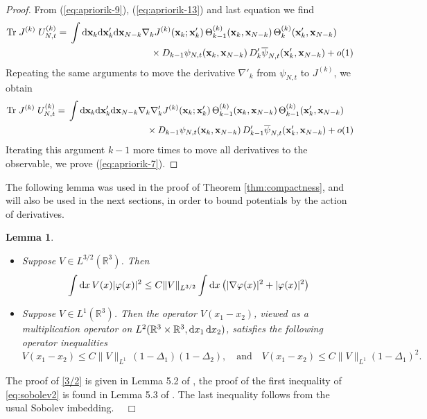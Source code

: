 \documentclass[11pt]{article}
\newtheorem{lemma}[theorem]{Lemma}
\newcommand{\rd}{{\rm d}}
\newcommand{\bx}{{\bf x}}
\newcommand{\ph}{\varphi}
\newcommand{\bR}{{\mathbb R}}
\newcommand{\tr}{\mbox{Tr}}
\begin{document}
\begin{proof}
\medskip

{F}rom (\ref{eq:apriorik-9}), (\ref{eq:apriorik-13}) and last
equation we find
\begin{equation}
\begin{split}
\tr \; J^{(k)} \; U_{N,t}^{(k)}
 = \; & \int \rd \bx_k \rd \bx'_k \rd \bx_{N-k} \nabla_k J^{(k)} (\bx_k; \bx'_k) \,
\Theta_{k-1}^{(k)} (\bx_k,\bx_{N-k}) \, \Theta_k^{(k)}
(\bx'_k,\bx_{N-k}) \\ &\hspace{3cm} \times  D_{k-1}  \psi_{N,t}
(\bx_k, \bx_{N-k}) \, D'_k \overline{\psi}_{N,t} (\bx'_k,\bx_{N-k})
+ o(1)
\end{split}
\end{equation}
Repeating the same arguments to move the derivative $\nabla'_k$ from
$ \psi_{N,t}$ to $J^{(k)}$, we obtain
\begin{equation}
\begin{split}
\tr \; J^{(k)} \; U_{N,t}^{(k)} = \; & \int \rd \bx_k \rd \bx'_k \rd
\bx_{N-k} \nabla_k \nabla'_k J^{(k)} (\bx_k; \bx'_k) \,
\Theta_{k-1}^{(k)} (\bx_k,\bx_{N-k}) \, \Theta_{k-1}^{(k)}
(\bx'_k,\bx_{N-k}) \\ &\hspace{3cm} \times D_{k-1}  \psi_{N,t}
(\bx_k, \bx_{N-k}) \, D'_{k-1} \overline{\psi}_{N,t}
(\bx'_k,\bx_{N-k}) + o(1)
\end{split}
\end{equation}
Iterating this argument $k-1$ more times to move all derivatives to
the observable, we prove (\ref{eq:apriorik-7}).
\end{proof}


The following lemma was used in the proof of Theorem
\ref{thm:compactness}, and will also be used in the next sections,
in order to bound potentials by the action of derivatives.

\begin{lemma}\label{lm:sobolev}
\begin{itemize}
\item[i)] Suppose $V \in L^{3/2} (\bR^3)$. Then
\begin{equation}\label{3/2}
\int \rd x \, V (x) |\ph (x)|^2 \leq C \| V \|_{L^{3/2}} \int \rd x
\left( |\nabla \ph (x)|^2 + |\ph (x)|^2 \right)
\end{equation}
\item[ii)] Suppose $V  \in L^1 (\bR^3)$. Then the operator $V (x_1 -x_2)$,
viewed as a multiplication operator on $L^2 (\bR^3\times \bR^3, \rd
x_1 \, \rd x_2)$, satisfies the  following operator inequalities
\begin{equation}\label{eq:sobolev2}
V (x_1 -x_2) \leq C \| V \|_{L^1} \, (1-\Delta_1) (1-\Delta_2),
\quad \text{and}  \quad V (x_1 -x_2) \leq C \| V \|_{L^1}
(1-\Delta_1)^2.
\end{equation}
\end{itemize}
\end{lemma}
The proof of \eqref{3/2} is given in Lemma 5.2 of \cite{ESY},
the proof of the first inequality of \eqref{eq:sobolev2}
is found in Lemma 5.3 of \cite{EY}. The last inequality follows
from the usual Sobolev imbedding. $\;\;\;\Box$
\end{document}
